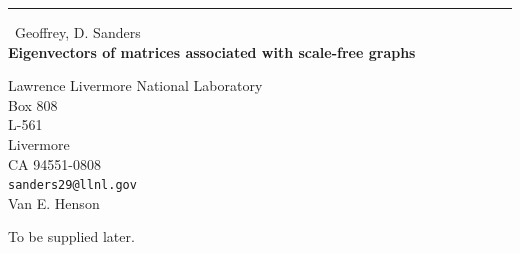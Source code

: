 \documentclass{report}
\begin{document}
\begin{center}
\rule{6in}{1pt} \
{\large Geoffrey, D. Sanders \\
{\bf Eigenvectors of matrices associated with scale-free graphs}}

Lawrence Livermore National Laboratory \\ Box 808 \\ L-561 \\ Livermore \\ CA 94551-0808
\\
{\tt sanders29@llnl.gov}\\
Van E. Henson\end{center}

To be supplied later.
\end{document}
